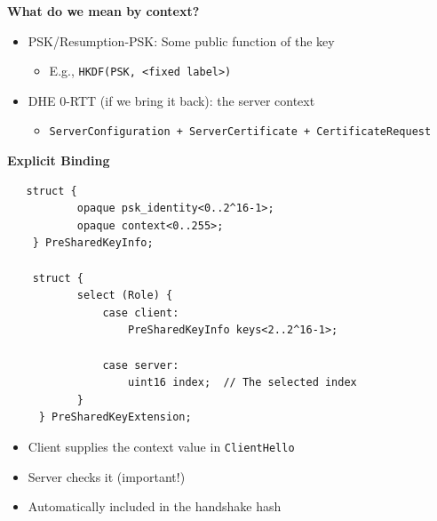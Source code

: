 \documentclass[helvetica]{seminar}
\newcommand{\heading}[1]{%
  \begin{center} 
    \large\bf 
    #1 
  \end{center} 
  \vspace{.4 in}}
\begin{document}
\begin{slide}
\heading{What do we mean by context?}

\begin{itemize}
\item PSK/Resumption-PSK: Some public function of the key
  \begin{itemize}
  \item E.g., \verb^HKDF(PSK, <fixed label>)^
  \end{itemize}

\item DHE 0-RTT (if we bring it back): the server context
  \begin{itemize}
  \item {\small \verb^ServerConfiguration + ServerCertificate + CertificateRequest^}
  \end{itemize}
\end{itemize}
\end{slide}


\begin{slide}
\heading{Explicit Binding}

\vspace{-3ex}
{\scriptsize
\begin{verbatim}
   struct {
           opaque psk_identity<0..2^16-1>;
           opaque context<0..255>;
    } PreSharedKeyInfo;

    struct {
           select (Role) {
               case client:
                   PreSharedKeyInfo keys<2..2^16-1>;

               case server:
                   uint16 index;  // The selected index
           }
     } PreSharedKeyExtension;
\end{verbatim}
}

\begin{itemize}
\item Client supplies the context value in \verb^ClientHello^
\item Server checks it (important!)
\item Automatically included in the handshake hash
\end{itemize}
\end{slide}
\end{document}
